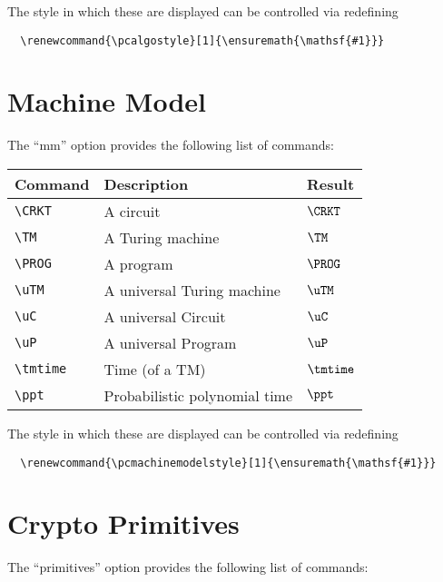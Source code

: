 \documentclass[a4paper]{report}
\begin{document}
  The style in which these are displayed can be controlled via redefining
  \begin{lstlisting}
  \renewcommand{\pcalgostyle}[1]{\ensuremath{\mathsf{#1}}}
  \end{lstlisting}
  
  
  \section{Machine Model}
  The \enquote{mm} option provides the following list of commands:
  
  \begin{center}
  \begin{tabular}{l l l}
  \textbf{Command} & \textbf{Description} & \textbf{Result} \\\hline
  \lstinline$\CRKT$ & A circuit & $\CRKT$  \\
  \lstinline$\TM$ & A Turing machine & $\TM$  \\
  \lstinline$\PROG$ & A program & $\PROG$  \\
  \lstinline$\uTM$ & A universal Turing machine & $\uTM$  \\
  \lstinline$\uC$ & A universal Circuit & $\uC$  \\
  \lstinline$\uP$ & A universal Program & $\uP$  \\
  \lstinline$\tmtime$ & Time (of a TM) & $\tmtime$  \\
  \lstinline$\ppt$ & Probabilistic polynomial time & $\ppt$  
  \end{tabular}
  \end{center}
  
  The style in which these are displayed can be controlled via redefining
  \begin{lstlisting}
  \renewcommand{\pcmachinemodelstyle}[1]{\ensuremath{\mathsf{#1}}}
  \end{lstlisting}
  
  \section{Crypto Primitives}
  The \enquote{primitives} option provides the following list of commands:
  
\end{document}
